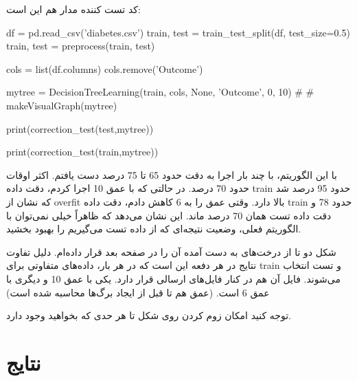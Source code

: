 \documentclass[12pt,titlepage,a4page , tikz , multi,table , svgnames,xcdraw]{article}
\begin{document}
کد تست کننده مدار هم این است:

\begin{latin}

\begin{python}

df = pd.read_csv('diabetes.csv')
train, test = train_test_split(df, test_size=0.5)
train, test = preprocess(train, test)

cols = list(df.columns)
cols.remove('Outcome')

mytree = DecisionTreeLearning(train, cols, None, 'Outcome', 0, 10)
#
#
makeVisualGraph(mytree)

print(correction_test(test,mytree))

print(correction_test(train,mytree))

\end{python}
\end{latin}

با این الگوریتم، با چند بار اجرا به دقت حدود 65 تا 75 درصد دست یافتم. اکثر اوقات حدود 70 درصد. در حالتی که با عمق 10 اجرا کردم، دقت داده train حدود 95 درصد شد که نشان از overfit بالا دارد. وقتی عمق را به 6 کاهش دادم، دقت داده train حدود 78 و دقت داده تست همان 70 درصد ماند. این نشان می‌دهد که ظاهراً خیلی نمی‌توان با الگوریتم فعلی، وضعیت نتیجه‌ای که از داده تست می‌گیریم را بهبود بخشید.

شکل دو تا از درخت‌های به دست آمده آن را در صفحه بعد قرار داده‌ام. دلیل تفاوت نتایج در هر دفعه این است که در هر بار، داده‌های متفاوتی برای train و تست انتخاب می‌شوند. فایل آن هم در کنار فایل‌های ارسالی قرار دارد. یکی با عمق 10 و دیگری با عمق 6 است. (عمق هم تا قبل از ایجاد برگ‌ها محاسبه شده است)

توجه کنید امکان زوم کردن روی شکل تا هر حدی که بخواهید وجود دارد.

\newpage





\newpage




\newpage

\section{نتایج}
\end{document}
